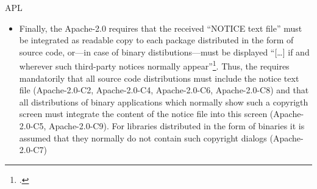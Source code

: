 \begin{license}{APL}
\begin{itemize}
  \item Finally, the Apache-2.0 requires that the received ``NOTICE text file''
  must be integrated as readable copy to each package distributed in the form of
  source code, or---in case of binary distibutions---must be displayed
  \enquote{[\ldots] if and wherever such third-party notices normally
  appear}\footcite[cf.][\nopage wp.\ §4.4]{Apl20OsiLicense2004a}. Thus, the
  \oslic{} requires mandatorily that all source code distributions must include
  the notice text file (Apache-2.0-C2, Apache-2.0-C4, Apache-2.0-C6,
  Apache-2.0-C8) and that all distributions of binary applications which
  normally show such a copyrigth screen must integrate the content of the notice
  file into this screen (Apache-2.0-C5, Apache-2.0-C9). For libraries
  distributed in the form of binaries it is assumed that they normally do not
  contain such copyright dialogs (Apache-2.0-C7)
\end{itemize}

\end{license}

%

